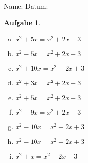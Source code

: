 \documentclass[12pt,fleqn]{article}
\theoremstyle{aufg}
\newtheorem{aufgabe}{Aufgabe}
\theoremstyle{bsp}
\begin{document}
 
    \begin{flushleft}
Name: \hspace{12cm} Datum:\begin{aufgabe} ~ \\ 
\begin{multicols}{3} 
\begin{enumerate}[a)] 
\item 
$x^{2} + 5 x = x^{2} + 2 x + 3$
\item 
$x^{2} - 5 x = x^{2} + 2 x + 3$
\item 
$x^{2} + 10 x = x^{2} + 2 x + 3$
\item 
$x^{2} + 3 x = x^{2} + 2 x + 3$
\item 
$x^{2} + 5 x = x^{2} + 2 x + 3$
\item 
$x^{2} - 9 x = x^{2} + 2 x + 3$
\item 
$x^{2} - 10 x = x^{2} + 2 x + 3$
\item 
$x^{2} - 10 x = x^{2} + 2 x + 3$
\item 
$x^{2} + x = x^{2} + 2 x + 3$
\end{enumerate} 
\end{multicols} 
\end{aufgabe} 
\end{flushleft} 
    
\end{document}
